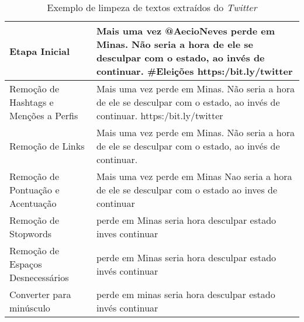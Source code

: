 \begin{table}
    \centering
    \caption{Exemplo de limpeza de textos extraídos do \textit{Twitter}}
    \label{tb:limpeza}
    
    \begin{tabular}{l|p{8cm}} 
    \hline
    Etapa Inicial       & Mais uma vez @AecioNeves perde em Minas.   Não seria a hora de ele se desculpar com o estado,   ao invés de continuar.  \#Eleições https:/bit.ly/twitter \\ \hline
    Remoção de Hashtags  e Menções a Perfis  & Mais uma vez    perde em Minas. Não seria a hora de ele se desculpar com o estado, ao invés de continuar. https:/bit.ly/twitter \\ \hline
    Remoção de Links                                                                  & Mais uma      vez perde em Minas. Não seria a hora de ele se desculpar com o estado, ao invés de continuar.   \\ \hline                                                                                                                                                    
    Remoção de Pontuação e  Acentuação                                               & Mais uma      vez perde em Minas Nao seria a hora de ele se desculpar com o estado ao inves de continuar  \\ \hline                                                                                                                                             
    Remoção de Stopwords                                                              & perde em Minas  seria  hora  desculpar  estado  inves continuar \\ \hline                                                                                                                                                                                         
    Remoção de Espaços Desnecessários                                             & perde em Minas seria hora desculpar estado invés continuar   \\ \hline                                                                                                                                                                                            
    Converter para minúsculo                                                          & perde em minas seria hora desculpar estado invés continuar  \\ \hline                                                                                                                                                                                                   
    \end{tabular}
    \end{table}



